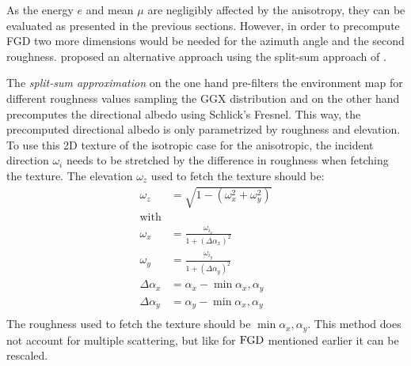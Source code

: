 %

As the energy $e$ and mean $\mu$ are negligibly affected by the anisotropy, they can be evaluated as presented in the previous sections. However, in order to precompute FGD two more dimensions would be needed for the azimuth angle and the second roughness. \textcite{weier2020} proposed an alternative approach using the split-sum approach of \textcite{karis2013}.

%

The \textit{split-sum approximation} on the one hand pre-filters the environment map for different roughness values sampling the GGX distribution and on the other hand precomputes the directional albedo using Schlick's Fresnel. This way, the precomputed directional albedo is only parametrized by roughness and elevation. To use this 2D texture of the isotropic case for the anisotropic, the incident direction $\omega_i$ needs to be stretched by the difference in roughness when fetching the texture. The elevation $\omega_z$ used to fetch the texture should be:
\begin{equation}
    \begin{aligned}
        \omega_z &= \sqrt{1-\left(\omega_x^2 + \omega_y^2\right)}\\
        \text{with}\\
        \omega_x &= \frac{\omega_{i_x}}{1+\left(\Delta \alpha_x\right)^2}\\
        \omega_y &= \frac{\omega_{i_y}}{1+\left(\Delta \alpha_y\right)^2}\\
        \Delta \alpha_x &= \alpha_x - \min{\alpha_x, \alpha_y}\\
        \Delta \alpha_y &= \alpha_y - \min{\alpha_x, \alpha_y}\\
    \end{aligned}
\end{equation}
The roughness used to fetch the texture should be $\min{\alpha_x, \alpha_y}$. This method does not account for multiple scattering, but like for $\operatorname{FGD}$ mentioned earlier it can be rescaled.

%

